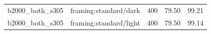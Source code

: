 \begin{longtable}{l>{\raggedright\arraybackslash}p{.42\linewidth}rrr}
b2000\_\allowbreak{}both\_\allowbreak{}s305 & %
framing:standard/dark & %
400 & %
79.50 & %
99.21 \\ %

b2000\_\allowbreak{}both\_\allowbreak{}s305 & %
framing:standard/light & %
400 & %
79.50 & %
99.14 \\ %


\end{longtable}
